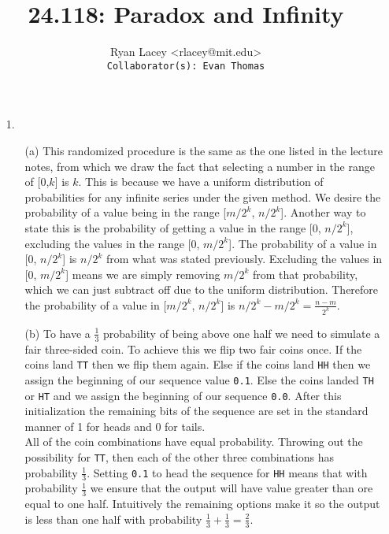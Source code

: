 \documentclass{article}
\begin{document}

\title{24.118: Paradox and Infinity}
\author{
  Ryan Lacey <rlacey@mit.edu>\\
  \footnotesize \texttt{Collaborator(s): Evan Thomas}
}
        
\maketitle
        


\begin{enumerate}
\item[1.]
	\begin{enumerate}
	\item[(a)]
		This randomized procedure is the same as the one listed in the lecture notes, from which we draw the fact that selecting a number in the range of [0,$k$]  is $k$. This is because we have a uniform distribution of probabilities for any infinite series under the given method. We desire the probability of a value being in the range [$m/2^k$, $n/2^k$]. Another way to state this is the probability of getting a value in the range [0, $n/2^k$], excluding the values in the range [0, $m/2^k$]. The probability of a value in [0, $n/2^k$] is $n/2^k$ from what was stated previously. Excluding the values in [0, $m/2^k$] means we are simply removing $m/2^k$ from that probability, which we can just subtract off due to the uniform distribution. Therefore the probability of a value in [$m/2^k$, $n/2^k$] is $n/2^k - m/2^k = \frac{n-m}{2^k}$.\\
	\item[(b)]
		To have a $\frac{1}{3}$ probability of being above one half we need to simulate a fair three-sided coin. To achieve this we flip two fair coins once. If the coins land \texttt{TT} then we flip them again. Else if the coins land \texttt{HH} then we assign the beginning of our sequence value \texttt{0.1}. Else the coins landed \texttt{TH} or \texttt{HT} and we assign the beginning of our sequence \texttt{0.0}. After this initialization the remaining bits of the sequence are set in the standard manner of 1 for heads and 0 for tails.\\
		
		All of the coin combinations have equal probability. Throwing out the possibility for \texttt{TT}, then each of the other three combinations has probability $\frac{1}{3}$. Setting \texttt{0.1} to head the sequence for \texttt{HH} means that with probability $\frac{1}{3}$ we ensure that the output will have value greater than ore equal to one half. Intuitively the remaining options make it so the output is less than one half with probability $\frac{1}{3} + \frac{1}{3} = \frac{2}{3}$. 
	\end{enumerate}


\end{enumerate}
\end{document}
